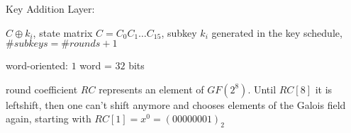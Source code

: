 \documentclass[landscape, a4paper]{article}
\begin{document}
\begin{minipage}[t]{0.198\pagewidth}
\begin{betterlist}
\begin{betterlist}
\begin{betterlist}
			\end{betterlist}
			\item \alert{Key Addition Layer:}
			\begin{betterlist}
				\item $C \oplus k_i$, state matrix $C = C_0C_1\ldots C_{15}$, \alert{subkey} $k_i$ generated in the \alert{key schedule}, $\#subkeys = \#rounds + 1$
				\item \alert{word-oriented:} $1$ word = $32$ bits
				\item \alert{round coefficient} $RC$ represents an element of $GF(2^8)$. Until $RC[8]$ it is leftshift, then one can't shift anymore and chooses elements of the Galois field again, starting with $RC[1] = x^0 = (00000001)_2$
			\end{betterlist}
		\end{betterlist}
	\end{betterlist}
\end{minipage}

\newpage
\end{document}
